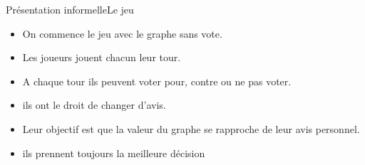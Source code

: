 \documentclass{beamer}
\begin{document}
\begin{frame}{Présentation informelle}{Le jeu}
\begin{minipage}[c]{.30\linewidth}
\begin{overprint}
      \end{overprint}
    \end{minipage}\hfill
    \begin{minipage}[c]{.70\linewidth}
      \begin{itemize}
        \item On commence le jeu avec le graphe sans vote.
        \item Les joueurs jouent chacun leur tour.
        \item A chaque tour ils peuvent voter pour, contre ou ne pas voter.
        \item ils ont le droit de changer d'avis.
        \item Leur objectif est que la valeur du graphe se rapproche de leur avis personnel.
        \item ils prennent toujours la meilleure décision
      \end{itemize}
    \end{minipage}
  \end{frame}
\end{document}
